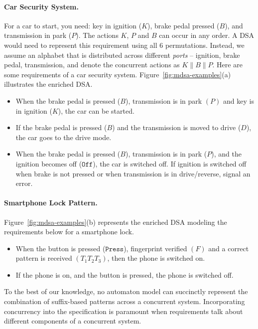    \paragraph*{Car Security System.} For a car to start, you need: key in ignition ($K$), brake pedal pressed ($B$), and transmission in park ($P$). The actions $K$, $P$ and $B$ can occur in any order. A DSA would need to represent this requirement using all $6$ permutations. Instead, we assume an alphabet that is distributed across different \emph{ports} -- ignition, brake pedal, transmission, and denote the concurrent actions as $K \parallel B \parallel P$. Here are some requirements of a car security system. Figure~\ref{fig:mdsa-examples}(a) illustrates the enriched DSA.

   \begin{itemize}
   \item When the brake pedal is pressed ($B$), transmission is in park $(P)$ and key is in ignition ($K$), the car can be started.
   \item If the brake pedal is pressed ($B$) and the transmission is moved to drive ($D$), the car goes to the drive mode.
   \item When the brake pedal is pressed ($B$), transmission is in park ($P$), and the ignition becomes off ($\mathtt{Off}$), the car is switched off. If ignition is switched off when brake is not pressed or when transmission is in drive/reverse, signal an error.
   \end{itemize}

  
   \paragraph*{Smartphone Lock Pattern.} 
   Figure~\ref{fig:mdsa-examples}(b) represents the enriched DSA modeling the requirements below for a smartphone lock.

   \begin{itemize}
   \item When the button is pressed ($\mathtt{Press}$), fingerprint verified $(F)$ and a correct pattern is received $(T_1 T_2 T_3)$, then the phone is switched on.
   \item If the phone is on, and the button is pressed, the phone is switched off.  
   \end{itemize}
   
  To the best of our knowledge, no automaton model can succinctly represent the combination of suffix-based patterns across a concurrent system. Incorporating concurrency into the specification is paramount when requirements talk about different components of a concurrent system. 
  
